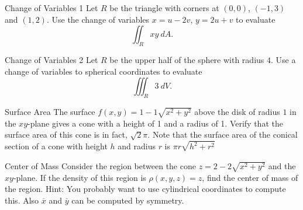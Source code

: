 \begin{revex}{Change of Variables 1}
Let $R$ be the triangle with corners at $(0,0)$, $(-1,3)$ and $(1,2)$. Use the change of variables $x=u-2v$, $y=2u+v$ to evaluate $$\iint_R xy\ dA. $$
\end{revex}

\begin{revex}{Change of Variables 2}
Let $R$ be the upper half of the sphere with radius $4$. Use a change of variables to spherical coordinates to evaluate $$\iiint_R 3\ dV. $$
\end{revex}

\begin{revex}{Surface Area}
The surface $f(x,y)=1-1\sqrt{x^2+y^2}$ above the disk of radius $1$ in the $xy$-plane gives a cone with a height of 1 and a radius of 1. Verify that the surface area of this cone is in fact, $\sqrt{2}\pi$. Note that the surface area of the conical section of a cone with height $h$ and radius $r$ is $\pi r\sqrt{h^2+r^2}$
\end{revex}

\begin{revex}{Center of Mass}
Consider the region between the cone $z=2-2\sqrt{x^2+y^2}$ and the $xy$-plane. If the density of this region is $\rho(x,y,z)=z$, find the center of mass of the region. Hint: You probably want to use cylindrical coordinates to compute this. Also $\overline{x}$ and $\overline{y}$ can be computed by symmetry.
\end{revex}
